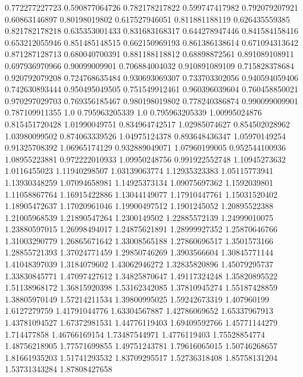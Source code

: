  0.772277227723   0.590877064726
 0.782178217822   0.599747417982
 0.792079207921    0.60863146897
  0.80198019802   0.617527946051
 0.811881188119   0.626435559385
 0.821782178218   0.635353001433
 0.831683168317   0.644278947446
 0.841584158416   0.653212055946
 0.851485148515   0.662150969193
 0.861386138614   0.671094313642
 0.871287128713   0.680040700391
 0.881188118812    0.68898872561
 0.891089108911   0.697936970966
  0.90099009901   0.706884004032
 0.910891089109   0.715828378684
 0.920792079208   0.724768635484
 0.930693069307   0.733703302056
 0.940594059406   0.742630893444
 0.950495049505   0.751549912461
 0.960396039604   0.760458850021
 0.970297029703   0.769356185467
 0.980198019802   0.778240386874
 0.990099009901   0.787109911355
            1.0   0.795963205339
            1.0   0.795963205339
  1.00995024876   0.815451720428
  1.01990049751   0.834964742517
  1.02985074627   0.854502028962
  1.03980099502   0.874063339526
  1.04975124378   0.893648436347
  1.05970149254    0.91325708392
  1.06965174129   0.932889049071
  1.07960199005   0.952544100936
  1.08955223881   0.972222010933
  1.09950248756   0.991922552748
  1.10945273632     1.0116455023
  1.11940298507    1.03139063774
  1.12935323383    1.05115773941
  1.13930348259    1.07094658981
  1.14925373134    1.09075697362
   1.1592039801    1.11058867764
  1.16915422886    1.13044149077
  1.17910447761    1.15031520402
  1.18905472637    1.17020961046
  1.19900497512     1.1901245052
  1.20895522388    1.21005968539
  1.21890547264     1.2300149502
  1.22885572139    1.24999010075
  1.23880597015    1.26998494017
  1.24875621891    1.28999927352
  1.25870646766    1.31003290779
  1.26865671642    1.33008565188
  1.27860696517     1.3501573166
  1.28855721393    1.37024771459
  1.29850746269     1.3903566604
  1.30845771144    1.41048397039
   1.3184079602    1.43062946272
  1.32835820896    1.45079295737
  1.33830845771    1.47097427612
  1.34825870647    1.49117324248
  1.35820895522    1.51138968172
  1.36815920398    1.53162342085
  1.37810945274    1.55187428859
  1.38805970149    1.57214211534
  1.39800995025    1.59242673319
    1.407960199     1.6127279759
  1.41791044776    1.63304567887
  1.42786069652    1.65337967913
  1.43781094527    1.67372981531
  1.44776119403    1.69409592766
  1.45771144279      1.714477858
  1.46766169154    1.73487544971
   1.4776119403    1.75528854774
  1.48756218905    1.77571699855
  1.49751243781    1.79616065015
  1.50746268657    1.81661935203
  1.51741293532    1.83709295517
  1.52736318408    1.85758131204
  1.53731343284    1.87808427658
